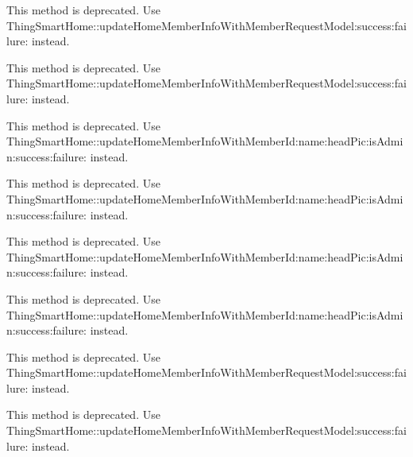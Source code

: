 \begin{DoxyRefList}
\label{deprecated__deprecated000067}%
%
This method is deprecated. Use Thing\+Smart\+Home\+::update\+Home\+Member\+Info\+With\+Member\+Request\+Model\+:success\+:failure\+: instead. 

\label{deprecated__deprecated000031}%
%
This method is deprecated. Use Thing\+Smart\+Home\+::update\+Home\+Member\+Info\+With\+Member\+Request\+Model\+:success\+:failure\+: instead.  
\item[(Thing\+Deprecated\+Api) Member \mbox{\hyperlink{category_thing_smart_home_member_07_thing_deprecated_api_08_af65b326a60a08124fb9cf914576f94ca}{\mbox{[}Thing\+Smart\+Home\+Member(Thing\+Deprecated\+Api) update\+Home\+Member\+Name\+With\+Member\+Id\+:name\+:is\+Admin\+:success\+:failure\+:\mbox{]}}} ]\label{deprecated__deprecated000028}%
%
This method is deprecated. Use Thing\+Smart\+Home\+::update\+Home\+Member\+Info\+With\+Member\+Id\+:name\+:head\+Pic\+:is\+Admin\+:success\+:failure\+: instead. 

\label{deprecated__deprecated000010}%
%
This method is deprecated. Use Thing\+Smart\+Home\+::update\+Home\+Member\+Info\+With\+Member\+Id\+:name\+:head\+Pic\+:is\+Admin\+:success\+:failure\+: instead. 

\label{deprecated__deprecated000064}%
%
This method is deprecated. Use Thing\+Smart\+Home\+::update\+Home\+Member\+Info\+With\+Member\+Id\+:name\+:head\+Pic\+:is\+Admin\+:success\+:failure\+: instead. 

\label{deprecated__deprecated000046}%
%
This method is deprecated. Use Thing\+Smart\+Home\+::update\+Home\+Member\+Info\+With\+Member\+Id\+:name\+:head\+Pic\+:is\+Admin\+:success\+:failure\+: instead.  
\item[(Thing\+Deprecated\+Api) Member \mbox{\hyperlink{category_thing_smart_home_member_07_thing_deprecated_api_08_a919e5e81a763d31fbf2fc844c48ad217}{\mbox{[}Thing\+Smart\+Home\+Member(Thing\+Deprecated\+Api) update\+Home\+Member\+Remark\+Name\+With\+Member\+Id\+:name\+:is\+Admin\+:success\+:failure\+:\mbox{]}}} ]\label{deprecated__deprecated000050}%
%
This method is deprecated. Use Thing\+Smart\+Home\+::update\+Home\+Member\+Info\+With\+Member\+Request\+Model\+:success\+:failure\+: instead. 

\label{deprecated__deprecated000068}%
%
This method is deprecated. Use Thing\+Smart\+Home\+::update\+Home\+Member\+Info\+With\+Member\+Request\+Model\+:success\+:failure\+: instead. 


\end{DoxyRefList}
